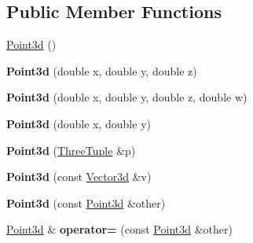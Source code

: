 \subsection*{Public Member Functions}
\begin{DoxyCompactItemize}
\item 
\hyperlink{classCartWheel_1_1Math_1_1Point3d_af235f71d169b07977561cf3fdf560604}{Point3d} ()
\item 
\hypertarget{classCartWheel_1_1Math_1_1Point3d_a5a9c5715daabe9ae3d42da2be8ef83ba}{
{\bfseries Point3d} (double x, double y, double z)}
\label{classCartWheel_1_1Math_1_1Point3d_a5a9c5715daabe9ae3d42da2be8ef83ba}

\item 
\hypertarget{classCartWheel_1_1Math_1_1Point3d_ac2f74113a7cc626bece9b6bc5d719ba9}{
{\bfseries Point3d} (double x, double y, double z, double w)}
\label{classCartWheel_1_1Math_1_1Point3d_ac2f74113a7cc626bece9b6bc5d719ba9}

\item 
\hypertarget{classCartWheel_1_1Math_1_1Point3d_aa65bea3d0ceaf97b4a5ef675c7f00bfa}{
{\bfseries Point3d} (double x, double y)}
\label{classCartWheel_1_1Math_1_1Point3d_aa65bea3d0ceaf97b4a5ef675c7f00bfa}

\item 
\hypertarget{classCartWheel_1_1Math_1_1Point3d_ab25b6a5b75617c8b123800b18d9a3f1e}{
{\bfseries Point3d} (\hyperlink{classCartWheel_1_1Math_1_1ThreeTuple}{ThreeTuple} \&p)}
\label{classCartWheel_1_1Math_1_1Point3d_ab25b6a5b75617c8b123800b18d9a3f1e}

\item 
\hypertarget{classCartWheel_1_1Math_1_1Point3d_a3297a799e17a64c60cfd9a21b6bbfe4f}{
{\bfseries Point3d} (const \hyperlink{classCartWheel_1_1Math_1_1Vector3d}{Vector3d} \&v)}
\label{classCartWheel_1_1Math_1_1Point3d_a3297a799e17a64c60cfd9a21b6bbfe4f}

\item 
\hypertarget{classCartWheel_1_1Math_1_1Point3d_a26000f1fa092ec31ad1206be2b4a9a4f}{
{\bfseries Point3d} (const \hyperlink{classCartWheel_1_1Math_1_1Point3d}{Point3d} \&other)}
\label{classCartWheel_1_1Math_1_1Point3d_a26000f1fa092ec31ad1206be2b4a9a4f}

\item 
\hypertarget{classCartWheel_1_1Math_1_1Point3d_a7bd2cbb9f6e3ffc134bcabfb98aa2de4}{
\hyperlink{classCartWheel_1_1Math_1_1Point3d}{Point3d} \& {\bfseries operator=} (const \hyperlink{classCartWheel_1_1Math_1_1Point3d}{Point3d} \&other)}
\label{classCartWheel_1_1Math_1_1Point3d_a7bd2cbb9f6e3ffc134bcabfb98aa2de4}


\end{DoxyCompactItemize}
